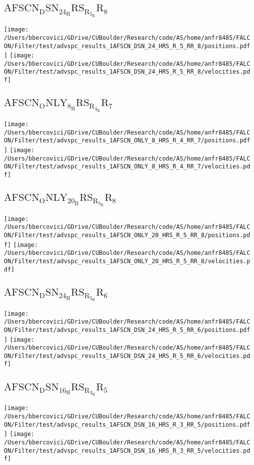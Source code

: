 \subsection{$\mathrm{AFSCN_DSN_24_HRS_R_5_RR_8}$}
\texttt{[image: /Users/bbercovici/GDrive/CUBoulder/Research/code/AS/home/anfr8485/FALCON/Filter/test/advspc\_results\_1AFSCN\_DSN\_24\_HRS\_R\_5\_RR\_8/positions.pdf]}
\texttt{[image: /Users/bbercovici/GDrive/CUBoulder/Research/code/AS/home/anfr8485/FALCON/Filter/test/advspc\_results\_1AFSCN\_DSN\_24\_HRS\_R\_5\_RR\_8/velocities.pdf]}
\subsection{$\mathrm{AFSCN_ONLY_8_HRS_R_4_RR_7}$}
\texttt{[image: /Users/bbercovici/GDrive/CUBoulder/Research/code/AS/home/anfr8485/FALCON/Filter/test/advspc\_results\_1AFSCN\_ONLY\_8\_HRS\_R\_4\_RR\_7/positions.pdf]}
\texttt{[image: /Users/bbercovici/GDrive/CUBoulder/Research/code/AS/home/anfr8485/FALCON/Filter/test/advspc\_results\_1AFSCN\_ONLY\_8\_HRS\_R\_4\_RR\_7/velocities.pdf]}
\subsection{$\mathrm{AFSCN_ONLY_20_HRS_R_5_RR_8}$}
\texttt{[image: /Users/bbercovici/GDrive/CUBoulder/Research/code/AS/home/anfr8485/FALCON/Filter/test/advspc\_results\_1AFSCN\_ONLY\_20\_HRS\_R\_5\_RR\_8/positions.pdf]}
\texttt{[image: /Users/bbercovici/GDrive/CUBoulder/Research/code/AS/home/anfr8485/FALCON/Filter/test/advspc\_results\_1AFSCN\_ONLY\_20\_HRS\_R\_5\_RR\_8/velocities.pdf]}
\subsection{$\mathrm{AFSCN_DSN_24_HRS_R_5_RR_6}$}
\texttt{[image: /Users/bbercovici/GDrive/CUBoulder/Research/code/AS/home/anfr8485/FALCON/Filter/test/advspc\_results\_1AFSCN\_DSN\_24\_HRS\_R\_5\_RR\_6/positions.pdf]}
\texttt{[image: /Users/bbercovici/GDrive/CUBoulder/Research/code/AS/home/anfr8485/FALCON/Filter/test/advspc\_results\_1AFSCN\_DSN\_24\_HRS\_R\_5\_RR\_6/velocities.pdf]}
\subsection{$\mathrm{AFSCN_DSN_16_HRS_R_3_RR_5}$}
\texttt{[image: /Users/bbercovici/GDrive/CUBoulder/Research/code/AS/home/anfr8485/FALCON/Filter/test/advspc\_results\_1AFSCN\_DSN\_16\_HRS\_R\_3\_RR\_5/positions.pdf]}
\texttt{[image: /Users/bbercovici/GDrive/CUBoulder/Research/code/AS/home/anfr8485/FALCON/Filter/test/advspc\_results\_1AFSCN\_DSN\_16\_HRS\_R\_3\_RR\_5/velocities.pdf]}
